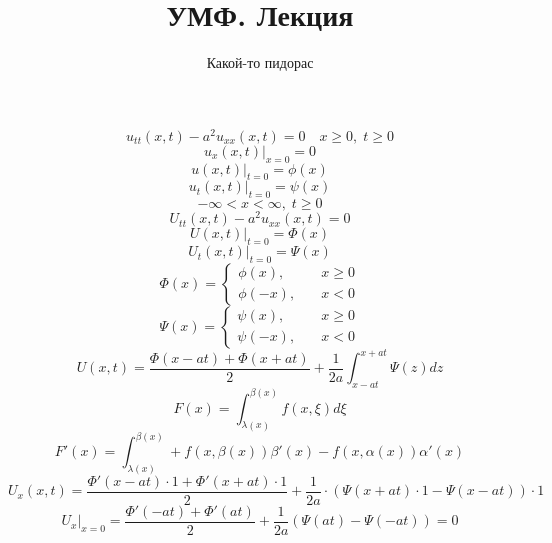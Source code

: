 \documentclass[a4paper]{article}
\begin{document}
\title{УМФ. Лекция}
\author{Какой-то пидорас}
\maketitle
\begin{equation}
    u_{t t}(x,t) - a^2 u_{xx}(x,t) = 0 \quad x \geq 0, \; t \geq 0
\end{equation}
\begin{equation}
    u_x(x,t) |_{x=0} = 0
\end{equation}
\begin{equation}
    u(x,t) |_{t=0} = \phi(x)
\end{equation}
\begin{equation}
    u_t(x,t) |_{t=0} = \psi(x)
\end{equation}
\[
    -\infty < x < \infty, \; t \geq 0
\]
\begin{equation}
    U_{t t}(x,t) - a^2 u_{xx}(x,t) = 0
\end{equation}
\begin{equation}
    U(x,t) |_{t=0} = \Phi(x)
\end{equation}
\begin{equation}
    U_t(x,t) |_{t=0} = \Psi(x)
\end{equation}
\begin{equation}
    \Phi(x) = \begin{cases}
        \phi(x), &\quad x \geq 0\\
        \phi(-x), &\quad x < 0
    \end{cases}
\end{equation}
\begin{equation}
    \Psi(x) = \begin{cases}
        \psi(x), &\quad x \geq 0\\
        \psi(-x), &\quad x < 0
    \end{cases}
\end{equation}
\begin{equation}
    U(x,t) = \frac{\Phi(x - at) + \Phi(x+at)}{2} + \frac{1}{2a} 
    \int_{x-at}^{x+at} \Psi(z) dz
\end{equation}
\[
    F(x) = \int_{\lambda(x)}^{\beta(x)} f(x,\xi) d\xi
\]
\[
    F'(x) = \int_{\lambda(x)}^{\beta(x)} + f(x, \beta(x)) \beta'(x) - f(x, \alpha(x))
    \alpha'(x)
\]
\[
    U_x(x,t) = \frac{\Phi'(x-at)\cdot 1 + \Phi'(x+at)\cdot 1}{2} + \frac{1}{2a} 
    \cdot (\Psi(x+at) \cdot 1 - \Psi(x-at)) \cdot 1
\]
\[
    U_x |_{x=0} = \frac{\Phi'(-at) + \Phi'(at)}{2} + \frac{1}{2a} (\Psi(at) - \Psi(-at))
    = 0
\]
\end{document}
